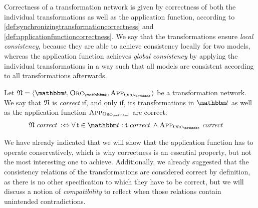Correctness of a transformation network is given by correctness of both the individual transformations as well as the application function, according to \autoref{def:synchronizingtransformationcorrectness} and \autoref{def:applicationfunctioncorrectness}.
We say that the transformations ensure \emph{local consistency}, because they are able to achieve consistency locally for two models, whereas the application function achieves \emph{global consistency} by applying the individual transformations in a way such that all models are consistent according to all transformations afterwards.

\begin{definition}
    \label{def:transformationnetworkcorrectness}
    Let $\transformationnetwork{N} = \tupled{\transformationset{T}, \orcfunction{\transformationset{T}}, \appfunction{\orcfunction{\transformationset{T}}}}$ be a transformation network.
    We say that $\transformationnetwork{N}$ is \emph{correct} if, and only if, its transformations in $\transformationset{T}$ as well as the application function $\appfunction{\orcfunction{\transformationset{T}}}$ are correct:
    \begin{align*}
        & 
       \transformationnetwork{N} \correctmath \equivalentperdefinition %
        \forall \transformation{t} \in \transformationset{T} : \transformation{t} \correctmath \land \appfunction{\orcfunction{\transformationset{T}}} \correctmath
    \end{align*}
\end{definition}

We have already indicated that we will show that the application function has to operate conservatively, which is why correctness is an essential property, but not the most interesting one to achieve.
Additionally, we already suggested that the consistency relations of the transformations are considered correct by definition, as there is no other specification to which they have to be correct, but we will discuss a notion of \emph{compatibility} to reflect when those relations contain unintended contradictions.



